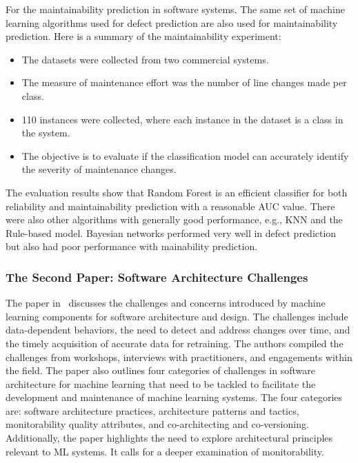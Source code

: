 \documentclass{article}
\begin{document}
For the maintainability prediction in software systems. The same set of machine learning algorithms used for defect prediction are also used for maintainability prediction. Here is a summary of the maintainability experiment:

\begin{itemize}
    \item The datasets were collected from two commercial systems.
    \item The measure of maintenance effort was the number of line changes made per class.
    \item 110 instances were collected, where each instance in the dataset is a class in the system.
    \item The objective is to evaluate if the classification model can accurately identify the severity of maintenance changes.
\end{itemize}

The evaluation results show that Random Forest is an efficient classifier for both reliability and maintainability prediction with a reasonable AUC value. There were also other algorithms with generally good performance, e.g., KNN and the Rule-based model. Bayesian networks performed very well in defect prediction but also had poor performance with mainability prediction. 

\subsubsection{The Second Paper: Software Architecture Challenges}

The paper in~\cite{9609199} discusses the challenges and concerns introduced by machine learning components for software architecture and design. The challenges include data-dependent behaviors, the need to detect and address changes over time, and the timely acquisition of accurate data for retraining. The authors compiled the challenges from workshops, interviews with practitioners, and engagements within the field. The paper also outlines four categories of challenges in software architecture for machine learning that need to be tackled to facilitate the development and maintenance of machine learning systems. The four categories are: software architecture practices, architecture patterns and tactics, monitorability quality attributes, and co-architecting and co-versioning. Additionally, the paper highlights the need to explore architectural principles relevant to ML systems. It calls for a deeper examination of monitorability.
\end{document}
